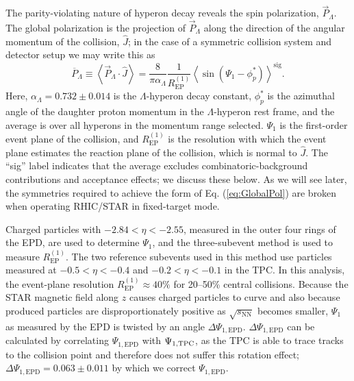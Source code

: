 \documentclass[
  reprint,
  superscriptaddress,
  amsmath,
  amssymb,
  aps,
  floatfix,
]{revtex4-2}
\newcommand{\proton}{p}
\newcommand{\sNN}{\sqrt{s_\mathrm{NN}}}
\newcommand{\JsysHat}{\hat{J}}
\newcommand{\REP}{R_\mathrm{EP}^{(1)}}
\newcommand{\pstar}{_\proton^{*}}
\newcommand{\PsiEP}{\Psi_{1}}
\newcommand{\PsiEpd}{\Psi_{1, \mathrm{EPD}}}
\newcommand{\PLambda}{\overline{P}_{\Lambda}}
\newcommand{\sig}{^\mathrm{sig}}
\begin{document}
The parity-violating nature of hyperon decay
 reveals the spin polarization, $\vec{P}_{\Lambda}$. The
 global polarization is the projection of
 $\vec{P}_{\Lambda}$ along the direction of the
 angular momentum of the collision, $\JsysHat$\cite{Abelev:2007zk,Becattini:2020ngo};
 in the case of a symmetric
 collision system and detector setup we
 may write this as\cite{STAR:2017ckg}
\begin{equation}
\label{eq:GlobalPol}
  \PLambda \equiv \left\langle\vec{P}_{\Lambda}\cdot\JsysHat\right\rangle 
  = \frac{8}{\pi\alpha_{\Lambda}}\frac{1}{\REP}\left\langle\sin\left(\PsiEP-\phi\pstar\right)\right\rangle\sig.
\end{equation}
Here, $\alpha_\Lambda=0.732\pm0.014$ is the $\Lambda$-hyperon decay
 constant\cite{Zyla:2020zbs}, $\phi\pstar$ is the azimuthal angle
 of the daughter proton momentum in
 the $\Lambda$-hyperon rest frame, and the
 average is over all hyperons in
 the momentum range selected. $\PsiEP$ is
 the first-order event plane of the
 collision, and $\REP$ is the resolution
 with which the event plane estimates
 the reaction plane of the collision,
 which is normal to $\JsysHat$. The
 ``sig'' label indicates that the average
 excludes combinatoric-background contributions and acceptance effects;
 we discuss these below. As we
 will see later, the symmetries required
 to achieve the form of Eq.
 (\ref{eq:GlobalPol}) are broken when operating RHIC/STAR
 in fixed-target mode.

Charged particles with $-2.84<\eta<-2.55$, measured in
 the outer four rings of the
 EPD, are used to determine $\PsiEP$\cite{Adams:2019fpo},
 and the three-subevent method\cite{Poskanzer:1998yz} is used
 to measure $\REP$. The two reference
 subevents used in this method use
 particles measured at $-0.5<\eta<-0.4$ and $-0.2<\eta<-0.1$
 in the TPC. In this analysis,
 the event-plane resolution $\REP\approx40\%$ for 20--50\%
 central collisions. Because the STAR magnetic
 field along $\hat{z}$ causes charged particles
 to curve and also because produced
 particles are disproportionately positive as $\sNN$
 becomes smaller, $\PsiEP$ as measured by
 the EPD is twisted by an
 angle $\Delta\PsiEpd$. $\Delta\PsiEpd$ can be calculated
 by correlating $\PsiEpd$ with $\Psi_{1, \rm{TPC}}$,
 as the TPC is able to
 trace tracks to the collision point
 and therefore does not suffer this
 rotation effect; $\Delta\PsiEpd=0.063\pm0.011$ by which we correct $\PsiEpd$.
\end{document}
